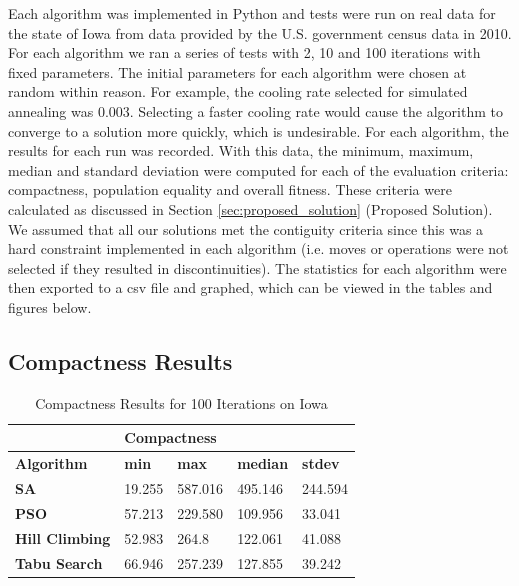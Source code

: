 \documentclass[journal]{IEEEtran}
\begin{document}
Each algorithm was implemented in Python and tests were run on real data for the state of Iowa from data provided by the U.S. government census data in 2010. For each algorithm we ran a series of tests with 2, 10 and 100 iterations with fixed parameters. The initial parameters for each algorithm were chosen at random within reason. For example, the cooling rate selected for simulated annealing was 0.003. Selecting a faster cooling rate would cause the algorithm to converge to a solution more quickly, which is undesirable.
For each algorithm, the results for each run was recorded. With this data, the minimum, maximum, median and standard deviation were computed for each of the evaluation criteria: compactness, population equality and overall fitness. These criteria were calculated as discussed in Section \ref{sec:proposed_solution} (Proposed Solution). We assumed that all our solutions met the contiguity criteria since this was a hard constraint implemented in each algorithm (i.e. moves or operations were not selected if they resulted in discontinuities). The statistics for each algorithm were then exported to a csv file and graphed, which can be viewed in the tables and figures below.

\subsection{Compactness Results}

\begin{table}[!h]
\centering
\caption{Compactness Results for 100 Iterations on Iowa}
\label{tab:comp_100iter}
\begin{tabular}{l|llll}
                       & \multicolumn{4}{l}{\textbf{Compactness}}                      \\ \hline
\textbf{Algorithm}     & \textbf{min} & \textbf{max} & \textbf{median} & \textbf{stdev} \\ \hline
\textbf{SA}            & 19.255       & 587.016      & 495.146         & 244.594       \\
\textbf{PSO}           & 57.213       & 229.580      & 109.956         & 33.041         \\
\textbf{Hill Climbing} & 52.983       & 264.8        & 122.061         & 41.088         \\
\textbf{Tabu Search}   & 66.946       & 257.239      & 127.855         & 39.242            
\end{tabular}
\end{table}
\end{document}
